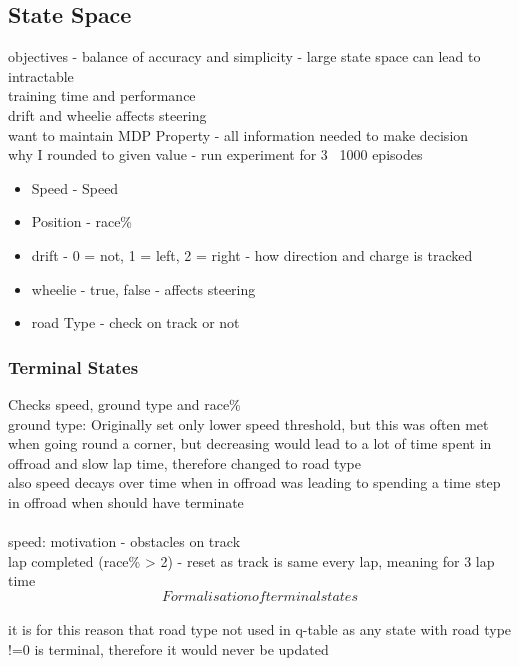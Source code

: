 \subsection{State Space}
objectives - balance of accuracy and simplicity - large state space can lead to intractable 
\\ training time and performance
\\drift and wheelie affects steering
\\want to maintain MDP Property - all information needed to make decision 
\\ why I rounded to given value - run experiment for 3 ~1000 episodes
\begin{itemize}
    \item Speed - Speed
    \item Position - race\%
    \item drift - 0 = not, 1 = left, 2 = right - how direction and charge is tracked
    \item wheelie - true, false - affects steering
    \item road Type - check on track or not
\end{itemize}

\subsubsection{Terminal States}
Checks speed, ground type and race\%\\
ground type: Originally set only lower speed threshold, but this was often met when going round a corner, but decreasing would lead to a lot of time spent in offroad and slow lap time, therefore changed to road type\\ also speed decays over time when in offroad was leading to spending a time step in offroad when should have terminate\\
\\speed: motivation - obstacles on track
\\lap completed (race\% > 2) - reset as track is same every lap, meaning for 3 lap time 
\[ Formalisation of terminal states\]
\\ it is for this reason that road type not used in q-table as any state with road type !=0 is terminal, therefore it would never be updated

